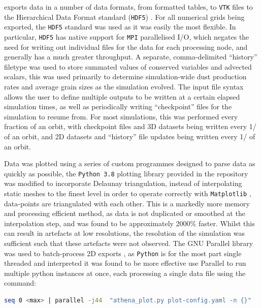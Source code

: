 \athena{} exports data in a number of data formats, from formatted tables, to \texttt{VTK} files \parencite{VTK4} to the Hierarchical Data Format standard (\texttt{HDF5}) \parencite{hdf5}.
For all numerical grids being exported, the \texttt{HDF5} standard was used as it was easily the most flexible.
In particular, \texttt{HDF5} has native support for \texttt{MPI} parallelised I/O, which negates the need for writing out individual files for the data for each processing node, and generally has a much greater throughput.
A separate, comma-delimited ``history'' filetype was used to store summated values of conserved variables and advected scalars, this was used primarily to determine simulation-wide dust production rates and average grain sizes as the simulation evolved.
The \athena{} input file syntax allows the user to define multiple outputs to be written at a certain elapsed simulation times, as well as periodically writing ``checkpoint'' files for the simulation to resume from.  
For most simulations, this was performed every fraction of an orbit, with checkpoint files and 3D datasets being written every 1/ of an orbit, and 2D datasets and ``history'' file updates being written every 1/ of an orbit.

Data was plotted using a series of custom programmes designed to parse data as quickly as possible, 
the \texttt{Python 3.8} \parencite{10.5555/1593511} plotting library provided in the \athena{} repository was modified to incorporate Delaunay triangulation, instead of interpolating static meshes to the finest level in order to operate correctly with \texttt{Matplotlib} \parencite{Hunter:2007}, data-points are triangulated with each other.
This is a markedly more memory and processing efficient method, as data is not duplicated or smoothed at the interpolation step, and was found to be approximately 2000\% faster.
Whilst this can result in artefacts at low resolutions, the resolution of the simulation was sufficient such that these artefacts were not observed.
The GNU Parallel library was used to batch-process 2D exports \parencite{tange_2021_5523272}, as \texttt{Python} is for the most part single threaded and interpreted it was found to be more effective use Parallel to run multiple python instances at once, each processing a single data file using the command:

\begin{lstlisting}[language=bash]
seq 0 <max> | parallel -j44  "athena_plot.py plot-config.yaml -n {}"
\end{lstlisting}

